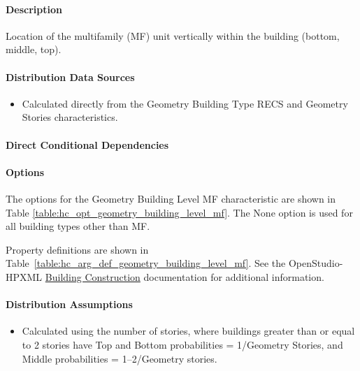 \paragraph{Description}
% 
Location of the multifamily (MF) unit vertically within the building (bottom, middle, top).

\paragraph{Distribution Data Sources}
% 
\begin{itemize}
    \item Calculated directly from the Geometry Building Type RECS and Geometry Stories characteristics.
\end{itemize}

\paragraph{Direct Conditional Dependencies}


\paragraph{Options}
The options for the Geometry Building Level MF characteristic are shown in Table \ref{table:hc_opt_geometry_building_level_mf}. The None option is used for all building types other than MF.



Property definitions are shown in Table~\ref{table:hc_arg_def_geometry_building_level_mf}. See the OpenStudio-HPXML \href{https://openstudio-hpxml.readthedocs.io/en/v1.10.0/workflow_inputs.html#hpxml-building-construction}{Building Construction} documentation for additional information.



\paragraph{Distribution Assumptions}
% 
\begin{itemize}
    \item Calculated using the number of stories, where buildings greater than or equal to 2 stories have Top and Bottom probabilities = 1/Geometry Stories, and Middle probabilities = 1--2/Geometry stories.
\end{itemize}
